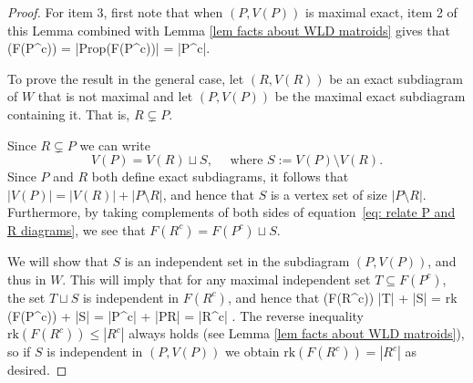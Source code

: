 \documentclass[11pt]{article}
\newcommand{\rk}{\textrm{rk} }
\def\ba #1\ea{\begin{align} #1 \end{align}}
\def\bas #1\eas{\begin{align*} #1 \end{align*}}
\newcommand{\cP}{\mathcal{P}}
\newcommand{\Prop}{\textrm{Prop}}
\theoremstyle{remark}
\theoremstyle{definition}
\begin{document}
\begin{proof}
%

For item 3, first note that when $(P,V(P))$ is maximal exact, item 2 of this Lemma combined with Lemma \ref{lem facts about WLD matroids} gives that
\bas\rk(F(P^c)) = |\Prop(F(P^c))| = |P^c|.\eas

To prove the result in the general case, let $(R,V(R))$ be an exact subdiagram of $W$ that is not maximal and let $(P, V(P))$ be the maximal exact subdiagram containing it. That is, $R \subsetneq P$.

Since $R \subsetneq P$ we can write 
\begin{equation}\label{eq: relate P and R diagrams}V(P) = V(R) \sqcup S, \quad \text{ where } S := V(P) \setminus V(R).\end{equation}
Since $P$ and $R$ both define exact subdiagrams, it follows that $|V(P)| = |V(R)| + |P \setminus R|$, and hence that $S$ is a vertex set of size $|P \setminus R|$. Furthermore, by taking complements of both sides of equation~\eqref{eq: relate P and R diagrams}, we see that $F(R^c) = F(P^c) \sqcup S$. 

We will show that $S$ is an independent set in the subdiagram $(P, V(P))$, and thus in $W$. This will imply that for any maximal independent set $T \subseteq F(P^c)$, the set $T \sqcup S$ is independent in $F(R^c)$, and hence that 
\bas \rk (F(R^c)) \geq |T| + |S| = \rk (F(P^c)) + |S| = |P^c| + |P\setminus R| = |R^c|  \;.\eas 
The reverse inequality $\rk (F(R^c)) \leq |R^c|$ always holds (see Lemma \ref{lem facts about WLD matroids}), so if $S$ is independent in $(P,V(P))$ we obtain $\rk (F(R^c)) = |R^c|$ as desired.


\end{proof}
\end{document}
